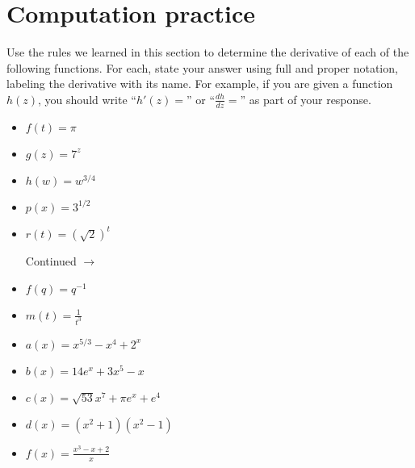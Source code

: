 \documentclass[11pt]{article}
\def\ra{\rightarrow}
\def\pageturn{\vfill 
\begin{flushright}
	\begin{small}
		Continued $\ra$
	\end{small}
\end{flushright} \newpage}
\begin{document}
\section{Computation practice}

Use the rules we learned in this section to determine the derivative of each of the following functions. For
each, state your answer using full and proper notation, labeling the derivative with its name. For example, if you are given a function $h(z)$, you should write ``$h'(z) =$'' or ``$\frac{dh}{dz}=$'' as part of your response. 

\begin{itemize}
	\item $f(t) = \pi$
	\vspace{0.5in}
	
	\item $g(z) = 7^z$ 
	\vspace{0.5in}
	
	\item $h(w) = w^{3/4}$
	\vspace{0.5in}
	
	\item $p(x) = 3^{1/2}$
	\vspace{0.5in}
	
	\item $r(t) = (\sqrt{2})^t$
	
	\pageturn
	
	\item $f(q) = q^{-1}$
	\vspace{0.5in}
	
	\item $m(t) = \frac{1}{t^3}$
	\vspace{0.5in}
	
	\item $a(x) = x^{5/3} - x^4 + 2^x$
	\vspace{0.5in}
	
	\item $b(x) = 14e^x + 3x^5 - x$ 
	\vspace{0.5in}
	
	\item $c(x) = \sqrt{53}x^7 + \pi e^x + e^4$
	\vspace{0.5in}
	
	\item $d(x) = (x^2+1)(x^2 - 1)$
	\vspace{0.5in}
	
	\item $f(x) = \frac{x^3 - x + 2}{x}$
	\vspace{0.5in}
	
\end{itemize}
\end{document}
